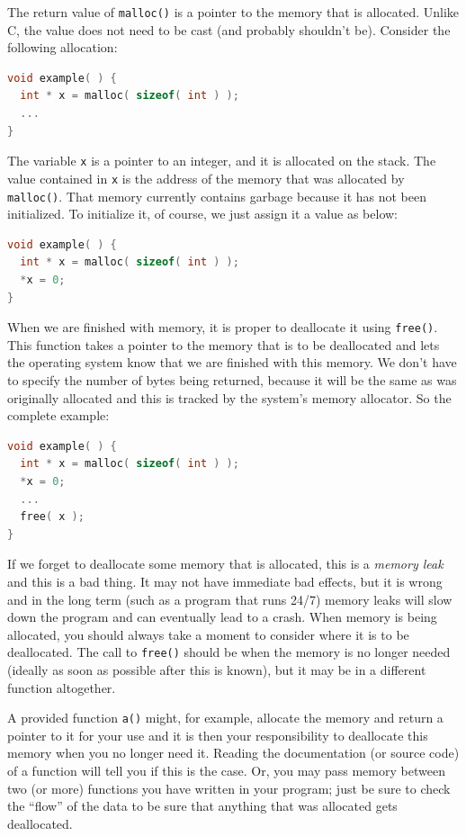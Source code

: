 \documentclass[a4paper]{report}
\newcommand{\Rplus}{\protect\hspace{-.1em}\protect\raisebox{.35ex}{\smaller{\smaller\textbf{+}}}}
\newcommand{\Cpp}{\mbox{C\Rplus\Rplus}\xspace}
\begin{document}
The return value of \texttt{malloc()} is a pointer to the memory that is allocated. Unlike \Cpp, the value does not need to be cast (and probably shouldn't be).
Consider the following allocation:

\begin{lstlisting}[language=C]
void example( ) {
  int * x = malloc( sizeof( int ) );
  ...
}
\end{lstlisting}

The variable \texttt{x} is a pointer to an integer, and it is allocated on the stack. The value contained in \texttt{x} is the address of the memory that was allocated by \texttt{malloc()}. That memory currently contains garbage because it has not been initialized. To initialize it, of course, we just assign it a value as below:

\begin{lstlisting}[language=C]
void example( ) {
  int * x = malloc( sizeof( int ) );
  *x = 0;
}
\end{lstlisting}

When we are finished with memory, it is proper to deallocate it using \texttt{free()}. This function takes a pointer to the memory that is to be deallocated and lets the operating system know that we are finished with this memory. We don't have to specify the number of bytes being returned, because it will be the same as was originally allocated and this is tracked by the system's memory allocator. So the complete example:

\begin{lstlisting}[language=C]
void example( ) {
  int * x = malloc( sizeof( int ) );
  *x = 0;
  ...
  free( x );
}
\end{lstlisting}

If we forget to deallocate some memory that is allocated, this is a \textit{memory leak} and this is a bad thing. It may not have immediate bad effects, but it is wrong and in the long term (such as a program that runs 24/7) memory leaks will slow down the program and can eventually lead to a crash. When memory is being allocated, you should always take a moment to consider where it is to be deallocated. The call to \texttt{free()} should be when the memory is no longer needed (ideally as soon as possible after this is known), but it may be in a different function altogether.

A provided function \texttt{a()} might, for example, allocate the memory and return a pointer to it for your use and it is then your responsibility to deallocate this memory when you no longer need it. Reading the documentation (or source code) of a function will tell you if this is the case. Or, you may pass memory between two (or more) functions you have written in your program; just be sure to check the ``flow'' of the data to be sure that anything that was allocated gets deallocated.
\end{document}
